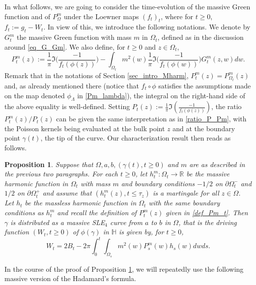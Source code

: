 \documentclass{article}
\newcommand{\HH}{{\mathbb{H}}}
\newtheorem{proposition}[theorem]{Proposition}
\theoremstyle{definition}
\theoremstyle{remark}
\theoremstyle{remark}
\begin{document}
In what follows, we are going to consider the time-evolution of the massive Green function and of $P_{\Omega}^m$ under the Loewner maps $(f_t)_t$, where for $t \geq 0$, $f_t:=g_t-W_t$. In view of this, we introduce the following notations. We denote by $G_t^{m}$ the massive Green function with mass $m$ in $\Omega_t$, defined as in the discussion around \eqref{eq_G_Gm}. We also define, for $t \geq 0$ and $z \in \Omega_t$,
\begin{equation} \label{def_Pm_t}
    P_t^m(z) := \frac{1}{\pi} \Im \bigg( \frac{-1}{f_t(\phi(z))} \bigg) - \int_{\Omega_t} m^2(w) \frac{1}{\pi} \Im \bigg( \frac{-1}{f_t(\phi(w))} \bigg) G_t^m(z,w) dw.
\end{equation}
Remark that in the notations of Section \ref{sec_intro_Mharm}, $P_t^m(z) = P_{\Omega_t}^m(z)$ and, as already mentioned there (notice that $f_t \circ \phi$ satisfies the assumptions made on the map denoted $\phi_{\Lambda}$ in \eqref{Pm_lambda}), the integral on the right-hand side of the above equality is well-defined. Setting $P_t(z) := \frac{1}{\pi} \Im ( \frac{-1}{f_t(\phi(z))})$, the ratio $P_t^m(z)/P_t(z)$ can be given the same interpretation as in \eqref{ratio_P_Pm}, with the Poisson kernels being evaluated at the bulk point $z$ and at the boundary point $\gamma(t)$, the tip of the curve. Our characterization result then reads as follows.

\begin{proposition} \label{prop_characterization}
Suppose that $\Omega,a,b,(\gamma(t),t\ge 0)$ and $m$ are as described in the previous two paragraphs. For each $t \geq 0$, let $h_t^m: \Omega_t \to \mathbb{R}$ be the massive harmonic function in $\Omega_t$ with mass $m$ and boundary conditions $-1/2$ on $\partial \Omega_t^{-}$ and $1/2$ on $\partial \Omega_t^{+}$ and assume that $(h_t^{m}(z), t \leq \tau_z)$ is a martingale for all $z \in \Omega$. Let $h_t$ be the massless harmonic function in $\Omega_t$ with the same boundary conditions as $h_t^m$ and recall the definition of $P_t^m(z)$ given in \eqref{def_Pm_t}. Then $\gamma$ is distributed as a massive SLE$_4$ curve from $a$ to $b$ in $\Omega$, that is the driving function $(W_t, t \geq 0)$ of $\phi(\gamma)$ in $\HH$ is given by, for $t \geq 0$,
\begin{equation} \label{driving_mSLE}
    W_t = 2B_t - 2\pi \int_{0}^{t}\int_{\Omega_s} m^2(w) P_s^{m}(w)h_s(w)dw ds.
\end{equation}
\end{proposition}

In the course of the proof of Proposition \ref{prop_characterization}, we will repeatedly use the following massive version of the Hadamard's formula.
\end{document}
